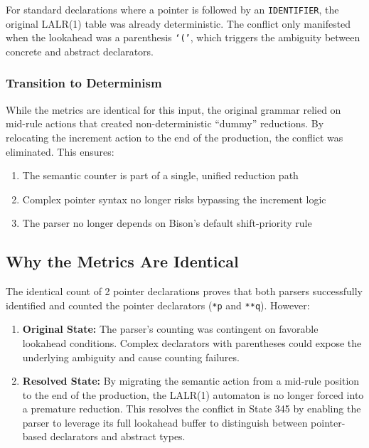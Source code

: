 \documentclass{article}
\begin{document}
For standard declarations where a pointer is followed by an \texttt{IDENTIFIER}, the original LALR(1) table was already deterministic. The conflict only manifested when the lookahead was a parenthesis \texttt{`('}, which triggers the ambiguity between concrete and abstract declarators.

\subsubsection{Transition to Determinism}

While the metrics are identical for this input, the original grammar relied on mid-rule actions that created non-deterministic ``dummy'' reductions. By relocating the increment action to the end of the production, the conflict was eliminated. This ensures:

\begin{enumerate}
    \item The semantic counter is part of a single, unified reduction path
    \item Complex pointer syntax no longer risks bypassing the increment logic
    \item The parser no longer depends on Bison's default shift-priority rule
\end{enumerate}


\subsection{Why the Metrics Are Identical}

The identical count of 2 pointer declarations proves that both parsers successfully identified and counted the pointer declarators (\texttt{*p} and \texttt{**q}). However:

\begin{enumerate}
    \item \textbf{Original State:} The parser's counting was contingent on favorable lookahead conditions. Complex declarators with parentheses could expose the underlying ambiguity and cause counting failures.
    
    \item \textbf{Resolved State:} By migrating the semantic action from a mid-rule position to the end of the production, the LALR(1) automaton is no longer forced into a premature reduction. This resolves the conflict in State 345 by enabling the parser to leverage its full lookahead buffer to distinguish between pointer-based declarators and abstract types.
\end{enumerate}
\end{document}
